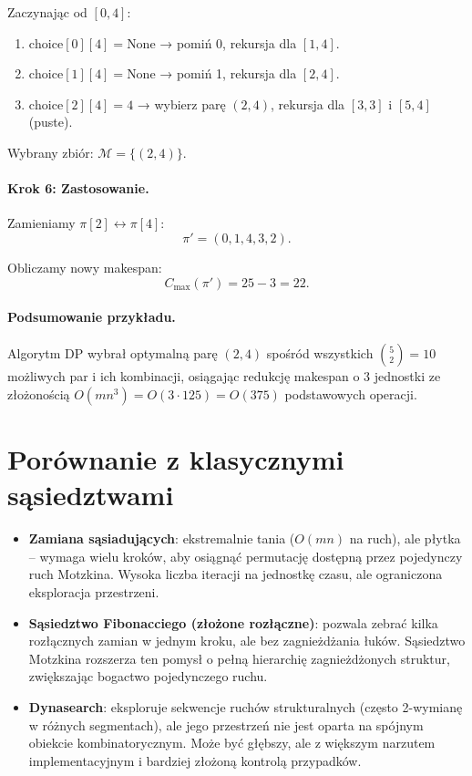Zaczynając od $[0,4]$:
\begin{enumerate}
  \item $\mathrm{choice}[0][4] = \text{None}$ → pomiń 0, rekursja dla $[1,4]$.
  \item $\mathrm{choice}[1][4] = \text{None}$ → pomiń 1, rekursja dla $[2,4]$.
  \item $\mathrm{choice}[2][4] = 4$ → wybierz parę $(2,4)$, rekursja dla $[3,3]$ i $[5,4]$ (puste).
\end{enumerate}
Wybrany zbiór: $\mathcal{M} = \{(2,4)\}$.

\paragraph{Krok 6: Zastosowanie.}

Zamieniamy $\pi[2] \leftrightarrow \pi[4]$:
\begin{equation}\label{eq_pi_prim}
\pi' = (0, 1, 4, 3, 2).
\end{equation}

Obliczamy nowy makespan:
\begin{equation}\label{eq_C_mar_pi_prim}
C_{\max}(\pi') = 25 - 3 = 22.
\end{equation}

\paragraph{Podsumowanie przykładu.}

Algorytm DP wybrał optymalną parę $(2,4)$ spośród wszystkich $\binom{5}{2} = 10$ możliwych par i ich kombinacji, osiągając redukcję makespan o 3 jednostki ze złożonością $O(mn^3) = O(3 \cdot 125) = O(375)$ podstawowych operacji.

\section{Porównanie z klasycznymi sąsiedztwami}

\begin{itemize}
  \item \textbf{Zamiana sąsiadujących}: ekstremalnie tania ($O(mn)$ na ruch), ale płytka -- wymaga wielu kroków, aby osiągnąć permutację dostępną przez pojedynczy ruch Motzkina. Wysoka liczba iteracji na jednostkę czasu, ale ograniczona eksploracja przestrzeni.
  
  \item \textbf{Sąsiedztwo Fibonacciego (złożone rozłączne)}: pozwala zebrać kilka rozłącznych zamian w jednym kroku, ale bez zagnieżdżania łuków. Sąsiedztwo Motzkina rozszerza ten pomysł o pełną hierarchię zagnieżdżonych struktur, zwiększając bogactwo pojedynczego ruchu.
  
  \item \textbf{Dynasearch}: eksploruje sekwencje ruchów strukturalnych (często 2-wymianę w różnych segmentach), ale jego przestrzeń nie jest oparta na spójnym obiekcie kombinatorycznym. Może być głębszy, ale z większym narzutem implementacyjnym i bardziej złożoną kontrolą przypadków.
\end{itemize}

